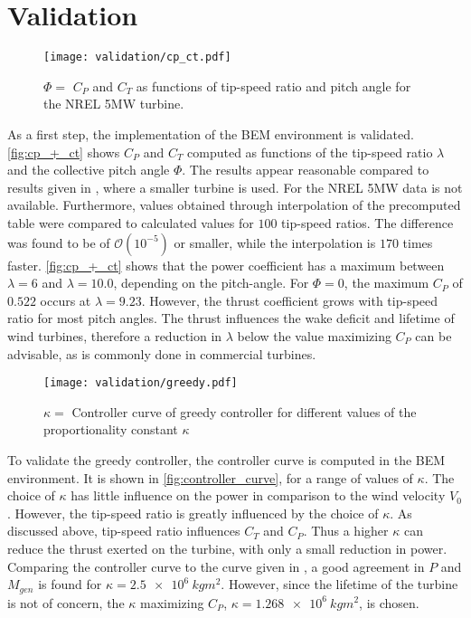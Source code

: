 \section{Validation}
\begin{figure}[h]
	\centering
	\texttt{[image: validation/cp\_ct.pdf]}
	\caption{$\Phi =$ 
		$C_P$ and $C_T$ as functions of tip-speed ratio and pitch angle for the NREL 5MW turbine.}
	\label{fig:cp_+_ct}
\end{figure}
As a first step, the implementation of the BEM environment is validated. \autoref{fig:cp_+_ct} shows $C_P$ and $C_T$ computed as functions of the tip-speed ratio $\lambda$ and the collective pitch angle $\Phi$. The results appear reasonable compared to results given in \cite{hansen_aerodynamics_2008}, where a smaller turbine is used. For the NREL 5MW data is not available. Furthermore, values obtained through interpolation of the precomputed table were compared to calculated values for $100$ tip-speed ratios. The difference was found to be of $\mathcal{O}\left(10^{-5}\right)$ or smaller, while the interpolation is $170$ times faster. \autoref{fig:cp_+_ct} shows that the power coefficient has a maximum between $\lambda=6$ and $\lambda=10.0$, depending on the pitch-angle. For $\Phi=0$, the maximum $C_P$ of $0.522$ occurs at $\lambda=9.23$. However, the thrust coefficient grows with tip-speed ratio for most pitch angles. The thrust influences the wake deficit and lifetime of wind turbines, therefore a reduction in $\lambda$ below the value maximizing $C_P$ can be advisable, as is commonly done in commercial turbines.\newpage
\begin{figure}[ht]
	\centering
	\texttt{[image: validation/greedy.pdf]}
	\caption{$\kappa =$ Controller curve of greedy controller for different values of the proportionality constant $\kappa$}
	\label{fig:controller_curve}
\end{figure}
To validate the greedy controller, the controller curve is computed in the BEM environment. It is shown in \autoref{fig:controller_curve}, for a range of values of $\kappa$. The choice of $\kappa$ has little influence on the power in comparison to the wind velocity $V_0$. However, the tip-speed ratio is greatly influenced by the choice of $\kappa$. As discussed above, tip-speed ratio influences $C_T$ and $C_P$. Thus a higher $\kappa$ can reduce the thrust exerted on the turbine, with only a small reduction in power. Comparing the controller curve to the curve given in \cite{jonkman_definition_2009}, a good agreement in $P$ and $M_{gen}$ is found for $\kappa=\SI{2.5e6}{kgm^2}$. However, since the lifetime of the turbine is not of concern, the $\kappa$ maximizing $C_P$,  $\kappa = \SI{1.268e6}{kgm^2}$, is chosen. 
